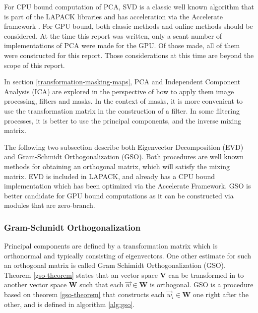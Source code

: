 \documentclass[11pt]{article}
\begin{document}
For CPU bound computation of PCA, SVD is a classic well known algorithm that is part of the LAPACK libraries and has  acceleration via the Accelerate framework \cite{apple-accelerate-framework}.  For GPU bound, both classic methods and online methods should be considered.  At the time this report was written, only a scant number of implementations of PCA were made for the GPU.  Of those made, all of them were constructed for this report.  Those considerations at this time are beyond the scope of this report. 

In section \ref{transformation-masking-maps}, PCA and Independent Component Analysis (ICA) are explored in the perspective of how to apply them image processing, filters and masks.  In the context of masks, it is more convenient to use the transformation matrix%
in the construction of a filter.  In some filtering processes, it is better to use the principal components, and the inverse mixing matrix.

The following two subsection describe both Eigenvector Decomposition (EVD) and Gram-Schmidt Orthogonalization (GSO).  Both procedures are well known methods for obtaining an orthogonal matrix, which will satisfy the mixing matrix.  EVD is included in LAPACK, and already has a CPU bound implementation which has been optimized via the Accelerate Framework.  GSO is better candidate for GPU bound computations as it can be constructed via modules that are zero-branch.


\subsubsection{Gram-Schmidt Orthogonalization}
Principal components are defined by a transformation matrix which is orthonormal and typically consisting of eigenvectors.  One other estimate for such an orthogonal matrix is called Gram Schimidt Orthogonalization (GSO).   %
Theorem \ref{gso-theorem} states that an vector space $\mathbf{V}$ can be transformed in to another vector space $\mathbf{W}$ such that each $\vec{w}\in \mathbf{W}$ is orthogonal.  GSO is a procedure based on theorem \ref{gso-theorem} that constructs each $\vec{w}_i \in \mathbf{W}$ one right after the other, and is defined in algorithm \ref{alg:gso}.
\end{document}
